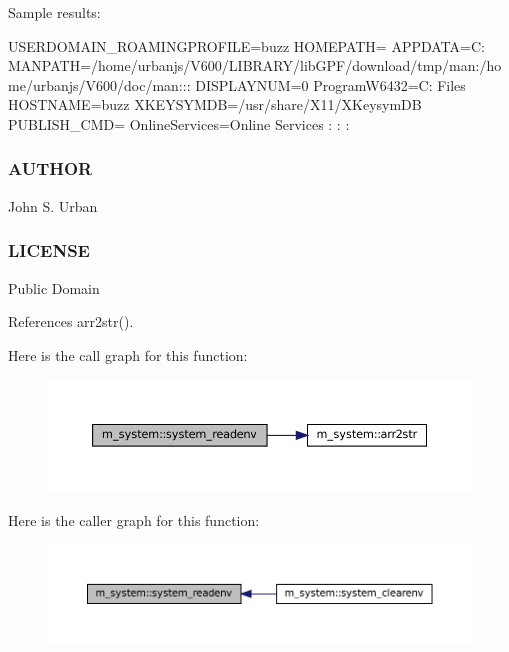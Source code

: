 Sample results\+:

U\+S\+E\+R\+D\+O\+M\+A\+I\+N\+\_\+\+R\+O\+A\+M\+I\+N\+G\+P\+R\+O\+F\+I\+LE=buzz H\+O\+M\+E\+P\+A\+TH= A\+P\+P\+D\+A\+TA=C\+: M\+A\+N\+P\+A\+TH=/home/urbanjs/\+V600/\+L\+I\+B\+R\+A\+R\+Y/lib\+G\+P\+F/download/tmp/man\+:/home/urbanjs/\+V600/doc/man\+:\+:\+: D\+I\+S\+P\+L\+A\+Y\+N\+UM=0 Program\+W6432=C\+: Files H\+O\+S\+T\+N\+A\+ME=buzz X\+K\+E\+Y\+S\+Y\+M\+DB=/usr/share/\+X11/\+X\+Keysym\+DB P\+U\+B\+L\+I\+S\+H\+\_\+\+C\+MD= Online\+Services=Online Services \+: \+: \+: \subsubsection*{A\+U\+T\+H\+OR}

John S. Urban \subsubsection*{L\+I\+C\+E\+N\+SE}

Public Domain 

References arr2str().

Here is the call graph for this function\+:\nopagebreak
\begin{figure}[H]
\begin{center}
\leavevmode
\includegraphics[width=350pt]{namespacem__system_ae0e43010a82a6a25402568ccb326322d_cgraph}
\end{center}
\end{figure}
Here is the caller graph for this function\+:\nopagebreak
\begin{figure}[H]
\begin{center}
\leavevmode
\includegraphics[width=350pt]{namespacem__system_ae0e43010a82a6a25402568ccb326322d_icgraph}
\end{center}
\end{figure}
\mbox{\label{namespacem__system_a70bbfa0a0be084b9717cbc04408041fc}} 

